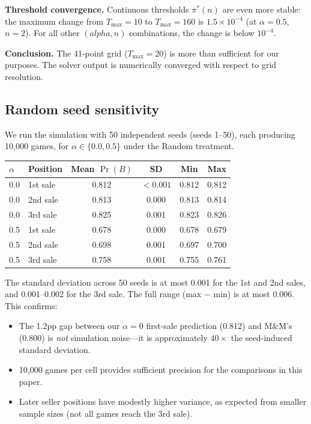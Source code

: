 \documentclass[11pt]{article}
\begin{document}
\textbf{Threshold convergence.} Continuous thresholds $\pi^*(n)$ are even
more stable: the maximum change from $T_{\max} = 10$ to $T_{\max} = 160$ is
$1.5 \times 10^{-4}$ (at $\alpha = 0.5$, $n = 2$). For all other
$(alpha, n)$ combinations, the change is below $10^{-4}$.

\textbf{Conclusion.} The 41-point grid ($T_{\max} = 20$) is more than
sufficient for our purposes. The solver output is numerically converged with
respect to grid resolution.

\subsection{Random seed sensitivity}

We run the simulation with 50 independent seeds (seeds 1--50), each
producing 10{,}000 games, for $\alpha \in \{0.0, 0.5\}$ under the Random
treatment.

\begin{center}
\small
\begin{tabular}{llcccc}
\toprule
$\alpha$ & Position & Mean $\Pr(B)$ & SD & Min & Max \\
\midrule
0.0 & 1st sale & 0.812 & $< 0.001$ & 0.812 & 0.812 \\
0.0 & 2nd sale & 0.813 & 0.000 & 0.813 & 0.814 \\
0.0 & 3rd sale & 0.825 & 0.001 & 0.823 & 0.826 \\
\midrule
0.5 & 1st sale & 0.678 & 0.000 & 0.678 & 0.679 \\
0.5 & 2nd sale & 0.698 & 0.001 & 0.697 & 0.700 \\
0.5 & 3rd sale & 0.758 & 0.001 & 0.755 & 0.761 \\
\bottomrule
\end{tabular}
\end{center}

The standard deviation across 50 seeds is at most 0.001 for the 1st and 2nd
sales, and 0.001--0.002 for the 3rd sale. The full range (max $-$ min) is
at most 0.006. This confirms:
\begin{itemize}
    \item The 1.2pp gap between our $\alpha = 0$ first-sale prediction (0.812)
    and M\&M's (0.800) is \textit{not} simulation noise---it is approximately
    $40 \times$ the seed-induced standard deviation.
    \item 10{,}000 games per cell provides sufficient precision for the
    comparisons in this paper.
    \item Later seller positions have modestly higher variance, as expected
    from smaller sample sizes (not all games reach the 3rd sale).
\end{itemize}
\end{document}
